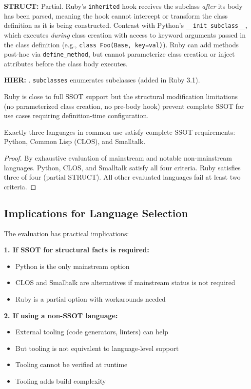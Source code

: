 \textbf{STRUCT:} Partial. Ruby's \texttt{inherited} hook receives the subclass \emph{after} its body has been parsed, meaning the hook cannot intercept or transform the class definition as it is being constructed. Contrast with Python's \texttt{\_\_init\_subclass\_\_}, which executes \emph{during} class creation with access to keyword arguments passed in the class definition (e.g., \texttt{class Foo(Base, key=val)}). Ruby can add methods post-hoc via \texttt{define\_method}, but cannot parameterize class creation or inject attributes before the class body executes.

\textbf{HIER:} \checkmark. \texttt{subclasses} enumerates subclasses (added in Ruby 3.1).

Ruby is close to full SSOT support but the structural modification limitations (no parameterized class creation, no pre-body hook) prevent complete SSOT for use cases requiring definition-time configuration.

\begin{theorem}\label{thm:three-lang}
Exactly three languages in common use satisfy complete SSOT requirements: Python, Common Lisp (CLOS), and Smalltalk.
\end{theorem}

\begin{proof}
By exhaustive evaluation of mainstream and notable non-mainstream languages. Python, CLOS, and Smalltalk satisfy all four criteria. Ruby satisfies three of four (partial STRUCT). All other evaluated languages fail at least two criteria.
\end{proof}

\subsection{Implications for Language Selection}\label{sec:implications}

The evaluation has practical implications:

\textbf{1. If SSOT for structural facts is required:}
\begin{itemize}
\tightlist
\item Python is the only mainstream option
\item CLOS and Smalltalk are alternatives if mainstream status is not required
\item Ruby is a partial option with workarounds needed
\end{itemize}

\textbf{2. If using a non-SSOT language:}
\begin{itemize}
\tightlist
\item External tooling (code generators, linters) can help
\item But tooling is not equivalent to language-level support
\item Tooling cannot be verified at runtime
\item Tooling adds build complexity
\end{itemize}

